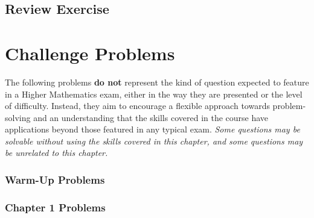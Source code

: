 \documentclass[
  11pt,
  openany]{book}
\begin{document}
\newpage

\section*{Review Exercise}\label{review-exercise-12}

\chapterfont{\color{white}}

\chapter*{Challenge Problems}\label{challenge-problems}

\vspace{-10.5cm}

\begin{center}
\end{center}

The following problems \textbf{do not} represent the kind of question expected to feature in a Higher Mathematics exam, either in the way they are presented or the level of difficulty. Instead, they aim to encourage a flexible approach towards problem-solving and an understanding that the skills covered in the course have applications beyond those featured in any typical exam. \emph{Some questions may be solvable without using the skills covered in this chapter, and some questions may be unrelated to this chapter.}

\subsection*{Warm-Up Problems}\label{warm-up-problems}

\newpage

\newpage

\subsection*{Chapter 1 Problems}\label{chapter-1-problems}
\end{document}
